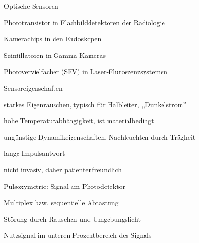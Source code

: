 \documentclass[a4paper]{article}
\begin{document}
\begin{multicols}{3}
  Optische Sensoren
  \begin{description*}
    \item[Phototransistor] in Flachbilddetektoren der Radiologie
    \item[Kamerachips] in den Endoskopen
    \item[Szintillatoren] in Gamma-Kameras
    \item[Photovervielfacher] (SEV) in Laser-Fluroszenzsystemen
  \end{description*}

  Sensoreigenschaften
  \begin{itemize*}
    \item starkes Eigenrauschen, typisch für Halbleiter, ,,Dunkelstrom''
    \item hohe Temperaturabhängigkeit, ist materialbedingt%
    \item ungünstige Dynamikeigenschaften, Nachleuchten durch Trägheit
    \item lange Impulsantwort
    \item nicht invasiv, daher patientenfreundlich
  \end{itemize*}



  Pulsoxymetrie: Signal am Photodetektor
  \begin{itemize*}
    \item Multiplex bzw. sequentielle Abtastung
    \item Störung durch Rauschen und Umgebungslicht%
    \item Nutzsignal im unteren Prozentbereich des Signals
  \end{itemize*}


\end{multicols}
\end{document}
